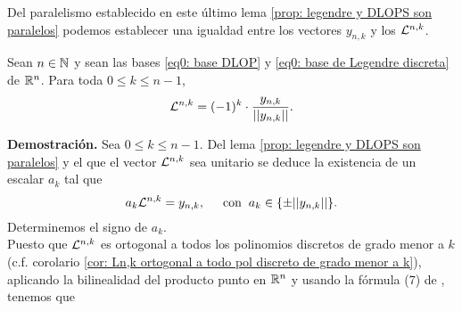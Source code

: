 \noindent Del paralelismo
establecido en este último lema
\ref{prop: legendre y DLOPS son paralelos}
podemos establecer una igualdad 
entre los vectores $y_{n,k}$ y los $\mathcal{L}^{n,k}$.

\begin{prop}
\label{prop: igualdad entre los de legendre y los del survey}
Sean $n \in \mathbb{N}$ y sean las bases 
\eqref{eq0: base DLOP} y 
\eqref{eq0: base de Legendre discreta} de $\mathbb{R}^{n}$.
Para toda $0 \leq k \leq n-1$, 
\begin{equation}
\label{eq9: 18ap}
\mathcal{L}^{n,k}= (-1)^{k} \cdot \frac{y_{n,k}}{||y_{n,k}||}.
\end{equation}
\end{prop}
\noindent
\textbf{Demostración.}
Sea $0 \leq k \leq n-1$. Del lema
\ref{prop: legendre y DLOPS son paralelos}
y el que el vector
$\mathcal{L}^{n,k}$ sea unitario
se deduce la existencia de un escalar $a_{k}$
tal que 
\begin{equation}
\label{eq10: 2Dic}
a_{k}\mathcal{L}^{n,k}= y_{n,k}, \hspace{0.5cm}
\text{con} \hspace{0.2cm} a_{k} \in \{ \pm || y_{n,k} || \}.
\end{equation}
Determinemos el signo de $a_{k}$. \\

\noindent Puesto que $\mathcal{L}^{n,k}$ es ortogonal a todos los polinomios
discretos de grado menor a $k$
(c.f. corolario
\ref{cor: Ln,k ortogonal a todo pol discreto de grado menor a k}), aplicando la bilinealidad
del producto punto en $\mathbb{R}^{n}$ y usando la fórmula 
(7) de \cite{Neuman},
tenemos que

